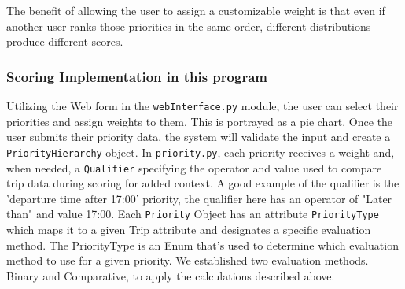 ﻿\documentclass[11pt]{article}
\begin{document}
The benefit of allowing the user to assign a customizable weight is that even if another user ranks those priorities
in the same order, different distributions produce different scores.

\subsubsection{Scoring Implementation in this program}
Utilizing the Web form in the \texttt{webInterface.py} module, the user can select their priorities and assign weights to them. This is portrayed as a pie chart.
Once the user submits their priority data, the system will validate the input and create a \texttt{PriorityHierarchy}
object. In \texttt{priority.py}, each priority receives a weight and, when needed, a \texttt{Qualifier} 
specifying the operator and value used to compare trip data during scoring for added context.
A good example of the qualifier is the 'departure time after 17:00' priority, the qualifier here has an operator of "Later than" and value 17:00. 
Each \texttt{Priority} Object has an attribute \texttt{PriorityType} which maps it to a given Trip attribute and designates a specific evaluation method.
The PriorityType is an Enum that's used to determine which evaluation method to use for a given priority.
We established two evaluation methods. Binary and Comparative, to apply the calculations described above.
\end{document}
